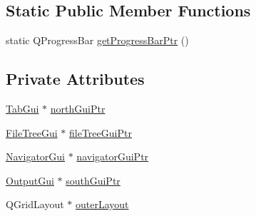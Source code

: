 \subsection*{Static Public Member Functions}
\begin{DoxyCompactItemize}
\item 
static Q\-Progress\-Bar \hyperlink{class_central_gui_ae5cac503c0a339c5cc3ba291973b6413}{get\-Progress\-Bar\-Ptr} ()
\end{DoxyCompactItemize}
\subsection*{Private Attributes}
\begin{DoxyCompactItemize}
\item 
\hyperlink{class_tab_gui}{Tab\-Gui} $\ast$ \hyperlink{class_central_gui_a9b03db6d32ac3138fde0213d41bea0af}{north\-Gui\-Ptr}
\item 
\hyperlink{class_file_tree_gui}{File\-Tree\-Gui} $\ast$ \hyperlink{class_central_gui_a6abfae93daa17e3af2a814888c9c14cf}{file\-Tree\-Gui\-Ptr}
\item 
\hyperlink{class_navigator_gui}{Navigator\-Gui} $\ast$ \hyperlink{class_central_gui_a902df8268cd1e83d1991ea88eafb9220}{navigator\-Gui\-Ptr}
\item 
\hyperlink{class_output_gui}{Output\-Gui} $\ast$ \hyperlink{class_central_gui_ae7012a7f0abe1fea596ce6af795c1741}{south\-Gui\-Ptr}
\item 
Q\-Grid\-Layout $\ast$ \hyperlink{class_central_gui_ab10e8028968ca8d5bf7b2cfe4b257d52}{outer\-Layout}
\end{DoxyCompactItemize}


